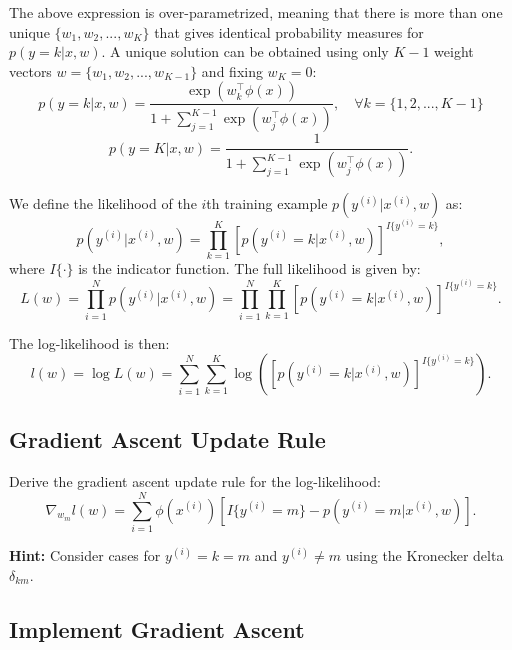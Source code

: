 \documentclass[lang=cn,11pt]{elegantbook}
\begin{document}
The above expression is over-parametrized, meaning that there is more than one unique $\{w_1,w_2, ...,w_K\}$ that gives identical probability measures for $p(y = k|x,w)$. A unique solution can be obtained using only $K-1$ weight vectors $w = \{w_1,w_2, ...,w_{K-1}\}$ and fixing $w_K = 0$:
\begin{equation}
    p(y = k|x,w) = \frac{\exp(w_k^\top \phi(x))}{1 + \sum_{j=1}^{K-1} \exp(w_j^\top \phi(x))}, \quad \forall k = \{1, 2, ...,K - 1\}
\end{equation}
\begin{equation}
    p(y = K|x,w) = \frac{1}{1 + \sum_{j=1}^{K-1} \exp(w_j^\top \phi(x))}.
\end{equation}

We define the likelihood of the $i$th training example $p(y^{(i)}|x^{(i)},w)$ as:
\begin{equation}
    p(y^{(i)}|x^{(i)},w) = \prod_{k=1}^{K} \left[ p(y^{(i)} = k|x^{(i)},w) \right]^{I\{y^{(i)}=k\}},
\end{equation}
where $I\{\cdot\}$ is the indicator function. The full likelihood is given by:
\begin{equation}
    L(w) = \prod_{i=1}^{N} p(y^{(i)}|x^{(i)},w) = \prod_{i=1}^{N} \prod_{k=1}^{K} \left[ p(y^{(i)} = k|x^{(i)},w) \right]^{I\{y^{(i)}=k\}}.
\end{equation}

The log-likelihood is then:
\begin{equation}
    l(w) = \log L(w) = \sum_{i=1}^{N} \sum_{k=1}^{K} \log \left( \left[ p(y^{(i)} = k|x^{(i)},w) \right]^{I\{y^{(i)}=k\}} \right).
\end{equation}

\subsection{Gradient Ascent Update Rule}

Derive the gradient ascent update rule for the log-likelihood:
\begin{equation}
    \nabla_{w_m} l(w) = \sum_{i=1}^{N} \phi(x^{(i)}) \left[I\{y^{(i)} = m\} - p(y^{(i)} = m | x^{(i)}, w)\right].
\end{equation}

\textbf{Hint:} Consider cases for $y^{(i)} = k = m$ and $y^{(i)} \neq m$ using the Kronecker delta $\delta_{km}$.

\subsection{Implement Gradient Ascent}
\end{document}
